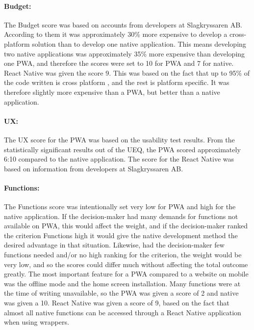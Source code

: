 \paragraph{Budget:} The Budget score was based on accounts from developers at Slagkryssaren AB. According to them it was approximately 30\% more expensive to develop a cross-platform solution than to develop one native application. This means developing two native applications was approximately 35\% more expensive than developing one PWA, and therefore the scores were set to 10 for PWA and 7 for native. React Native was given the score 9. This was based on the fact that up to 95\% of the code written is cross platform \cite{Ganguly2018}, and the rest is platform specific. It was therefore slightly more expensive than a PWA, but better than a native application. 

\paragraph{UX:} The UX score for the PWA was based on the usability test results. From the statistically significant results out of the UEQ, the PWA scored approximately 6:10 compared to the native application. The score for the React Native was based on information from developers at Slagkryssaren AB.

\paragraph{Functions:} The Functions score was intentionally set very low for PWA and high for the native application. If the decision-maker had many demands for functions not available on PWA, this would affect the weight, and if the decision-maker ranked the criterion Functions high it would give the native development method the desired advantage in that situation. Likewise, had the decision-maker few functions needed and/or no high ranking for the criterion, the weight would be very low, and so the scores could differ much without affecting the total outcome greatly. The most important feature for a PWA compared to a website on mobile was the offline mode and the home screen installation. Many functions were at the time of writing unavailable, so the PWA was given a score of 2 and native was given a 10. React Native was given a score of 9, based on the fact that almost all native functions can be accessed through a React Native application when using wrappers. 

